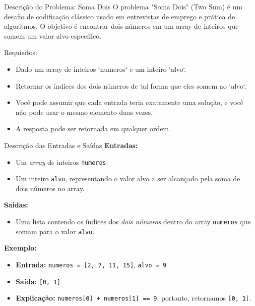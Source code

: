 \begin{frame}[fragile]{Descrição do Problema: Soma Dois}
O problema "Soma Dois" (Two Sum) é um desafio de codificação clássico 
usado em entrevistas de emprego e prática de algoritmos. O objetivo é 
encontrar dois números em um array de inteiros que somem um valor alvo 
específico.

Requisitos:
\begin{itemize}
  \item Dado um array de inteiros `numeros` e um inteiro `alvo`.
  \item Retornar os índices dos dois números de tal forma que eles somem ao `alvo`.
  \item Você pode assumir que cada entrada teria exatamente uma solução, e você não pode usar o mesmo elemento duas vezes.
  \item A resposta pode ser retornada em qualquer ordem.
\end{itemize}

\end{frame}
\begin{frame}{Descrição das Entradas e Saídas}
  \textbf{Entradas:}
  \begin{itemize}
      \item Um \textit{array} de inteiros \texttt{numeros}.
      \item Um inteiro \texttt{alvo}, representando o valor alvo a ser alcançado pela soma de dois números no array.
  \end{itemize}
  
  \textbf{Saídas:}
  \begin{itemize}
      \item Uma lista contendo os índices dos \textit{dois números} dentro do array \texttt{numeros} que somam para o valor \texttt{alvo}.
  \end{itemize}
  
  \textbf{Exemplo:}
  \begin{itemize}
      \item \textbf{Entrada:} \texttt{numeros = [2, 7, 11, 15]}, \texttt{alvo = 9}
      \item \textbf{Saída:} \texttt{[0, 1]}
      \item \textbf{Explicação:} \texttt{numeros[0] + numeros[1] == 9}, portanto, retornamos \texttt{[0, 1]}.
  \end{itemize}
\end{frame}

